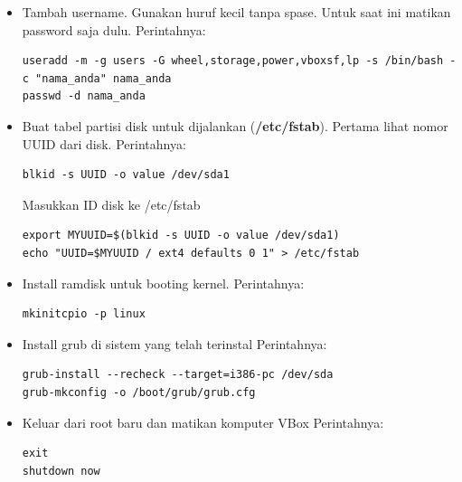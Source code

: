 \documentclass[12pt,]{article}
\begin{document}
\begin{itemize}
		\item Tambah username. Gunakan huruf kecil tanpa spase.
		Untuk saat ini matikan password saja dulu.	
		Perintahnya:
		\begin{verbatim}
useradd -m -g users -G wheel,storage,power,vboxsf,lp -s /bin/bash -c "nama_anda" nama_anda
passwd -d nama_anda
		\end{verbatim}
		
		\item Buat tabel partisi disk untuk dijalankan (\textbf{/etc/fstab}).
		Pertama lihat nomor UUID dari disk. Perintahnya:
		\begin{verbatim}
blkid -s UUID -o value /dev/sda1
		\end{verbatim}
		Masukkan ID disk ke /etc/fstab
		\begin{verbatim}
export MYUUID=$(blkid -s UUID -o value /dev/sda1)
echo "UUID=$MYUUID / ext4 defaults 0 1" > /etc/fstab
		\end{verbatim}
		
		\item Install ramdisk untuk booting kernel.
		Perintahnya:
		\begin{verbatim}
mkinitcpio -p linux
		\end{verbatim}
		
		\item Install grub di sistem yang telah terinstal
		Perintahnya:
		\begin{verbatim}
grub-install --recheck --target=i386-pc /dev/sda
grub-mkconfig -o /boot/grub/grub.cfg
		\end{verbatim}
		
		\item Keluar dari root baru dan matikan komputer VBox
		Perintahnya:
		\begin{verbatim}
exit
shutdown now
		\end{verbatim}
	
	\end{itemize}
	
\end{document}
